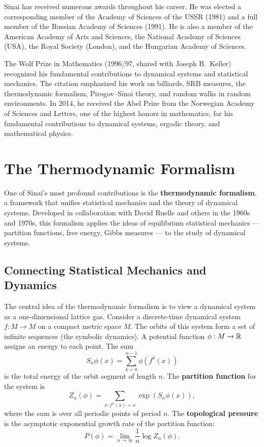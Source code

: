 Sinai has received numerous awards throughout his career. He was elected a corresponding member of the Academy of Sciences of the USSR (1981) and a full member of the Russian Academy of Sciences (1991). He is also a member of the American Academy of Arts and Sciences, the National Academy of Sciences (USA), the Royal Society (London), and the Hungarian Academy of Sciences.

The Wolf Prize in Mathematics (1996/97, shared with Joseph B.\ Keller) recognized his fundamental contributions to dynamical systems and statistical mechanics. The citation emphasized his work on billiards, SRB measures, the thermodynamic formalism, Pirogov--Sinai theory, and random walks in random environments. In 2014, he received the Abel Prize from the Norwegian Academy of Sciences and Letters, one of the highest honors in mathematics, for his fundamental contributions to dynamical systems, ergodic theory, and mathematical physics.

\section{The Thermodynamic Formalism}

One of Sinai's most profound contributions is the \textbf{thermodynamic formalism}, a framework that unifies statistical mechanics and the theory of dynamical systems. Developed in collaboration with David Ruelle and others in the 1960s and 1970s, this formalism applies the ideas of equilibrium statistical mechanics --- partition functions, free energy, Gibbs measures --- to the study of dynamical systems.

\subsection{Connecting Statistical Mechanics and Dynamics}

The central idea of the thermodynamic formalism is to view a dynamical system as a one-dimensional lattice gas. Consider a discrete-time dynamical system \(f: M \to M\) on a compact metric space \(M\). The orbits of this system form a set of infinite sequences (the symbolic dynamics). A potential function \(\phi: M \to \mathbb{R}\) assigns an energy to each point. The sum
\[
S_n \phi(x) = \sum_{k=0}^{n-1} \phi(f^k(x))
\]
is the total energy of the orbit segment of length \(n\). The \textbf{partition function} for the system is
\[
Z_n(\phi) = \sum_{x: f^n(x) = x} \exp(S_n \phi(x)),
\]
where the sum is over all periodic points of period \(n\). The \textbf{topological pressure} is the asymptotic exponential growth rate of the partition function:
\[
P(\phi) = \lim_{n \to \infty} \frac{1}{n} \log Z_n(\phi).
\]

